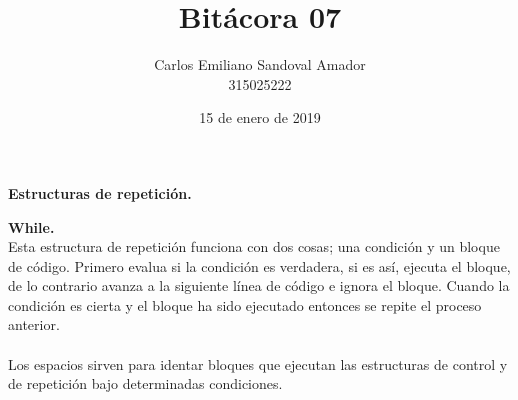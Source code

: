 \documentclass[letterpaper, 12pt, oneside]{article}%
\title{Bitácora 07}
\author{Carlos Emiliano Sandoval Amador \\ 315025222}
\date{15 de enero de 2019}
\begin{document}
	\maketitle
	\begin{center}
		\textbf{\Large Estructuras de repetición.}
	\end{center}
	\textbf{While.} \\ Esta estructura de repetición funciona con dos cosas; una condición y un bloque de código. Primero evalua si la condición es verdadera, si es así, ejecuta el bloque, de lo contrario avanza a la siguiente línea de código e ignora el bloque. Cuando la condición es cierta y el bloque ha sido ejecutado entonces se repite el proceso anterior.  \\ \\ Los espacios sirven para identar bloques que ejecutan las estructuras de control y de repetición bajo determinadas condiciones.
\end{document}
